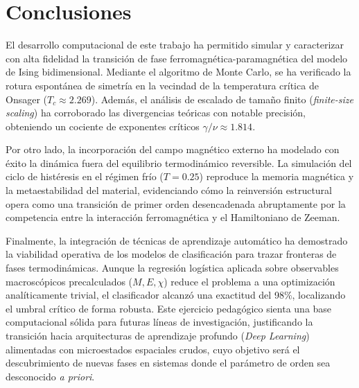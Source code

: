 \section{Conclusiones}

El desarrollo computacional de este trabajo ha permitido simular y caracterizar con alta fidelidad la transición de fase ferromagnética-paramagnética del modelo de Ising bidimensional. Mediante el algoritmo de Monte Carlo, se ha verificado la rotura espontánea de simetría en la vecindad de la temperatura crítica de Onsager ($T_c \approx 2.269$). Además, el análisis de escalado de tamaño finito (\textit{finite-size scaling}) ha corroborado las divergencias teóricas con notable precisión, obteniendo un cociente de exponentes críticos $\gamma/\nu \approx 1.814$. 

Por otro lado, la incorporación del campo magnético externo ha modelado con éxito la dinámica fuera del equilibrio termodinámico reversible. La simulación del ciclo de histéresis en el régimen frío ($T=0.25$) reproduce la memoria magnética y la metaestabilidad del material, evidenciando cómo la reinversión estructural opera como una transición de primer orden desencadenada abruptamente por la competencia entre la interacción ferromagnética y el Hamiltoniano de Zeeman.

Finalmente, la integración de técnicas de aprendizaje automático ha demostrado la viabilidad operativa de los modelos de clasificación para trazar fronteras de fases termodinámicas. Aunque la regresión logística aplicada sobre observables macroscópicos precalculados ($M, E, \chi$) reduce el problema a una optimización analíticamente trivial, el clasificador alcanzó una exactitud del 98\%, localizando el umbral crítico de forma robusta. Este ejercicio pedagógico sienta una base computacional sólida para futuras líneas de investigación, justificando la transición hacia arquitecturas de aprendizaje profundo (\textit{Deep Learning}) alimentadas con microestados espaciales crudos, cuyo objetivo será el descubrimiento de nuevas fases en sistemas donde el parámetro de orden sea desconocido \textit{a priori}.